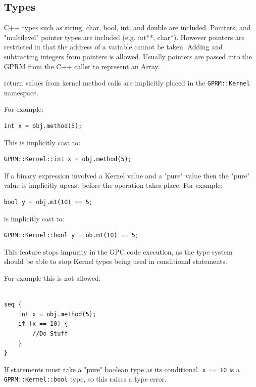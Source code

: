\subsection{Types}
        C++ types such as string, char, bool, int, and double are included.
        Pointers, and "multilevel" pointer types are included (e.g. int**, char*).
        However pointers are restricted in that the address of a variable
        cannot be taken. Adding and subtracting integers
        from pointers is allowed. Usually pointers are passed into
        the GPRM from the C++ caller to represent an Array.

        return values from kernel method calls are implicitly placed
        in the \texttt{GPRM::Kernel} namespace. 

For example:

\begin{lstlisting}[style=myGPC]
int x = obj.method(5);
\end{lstlisting}

This is implicitly cast to:

\begin{lstlisting}[style=myGPC]
GPRM::Kernel::int x = obj.method(5);
\end{lstlisting}     

If a binary expression involved a Kernel value and a "pure" value
then the "pure" value is implicitly upcast before the operation takes
place. For example:

\begin{lstlisting}[style=myGPC]
bool y = obj.m1(10) == 5;    
\end{lstlisting}

is implicitly cast to:

\begin{lstlisting}[style=myGPC]
GPRM::Kernel::bool y = ob.m1(10) == 5;
\end{lstlisting}

This feature stops impurity in the GPC code execution, as the type system
should be able to stop Kernel types being used in conditional
statements. 

For example this is not allowed:
\begin{lstlisting}[style=myGPC]

seq {
    int x = obj.method(5);
    if (x == 10) {
        //Do Stuff
    }    
}

\end{lstlisting}

If statements must take a "pure" boolean type as its conditional.
\texttt{x == 10} is a \texttt{GPRM::Kernel::bool} type, so this raises a type error.
  
